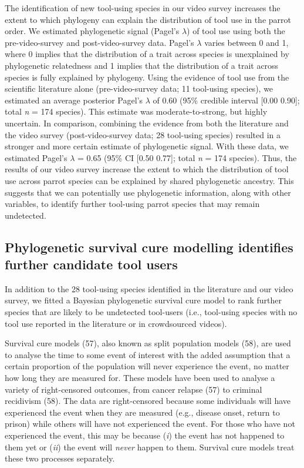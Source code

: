 \documentclass[
  man,floatsintext]{apa6}
\begin{document}
The identification of new tool-using species in our video survey increases the
extent to which phylogeny can explain the distribution of tool use in the parrot
order. We estimated phylogenetic signal (Pagel's \(\lambda\)) of tool use using
both the pre-video-survey and post-video-survey data. Pagel's \(\lambda\) varies
between 0 and 1, where 0 implies that the distribution of a trait across species
is unexplained by phylogenetic relatedness and 1 implies that the distribution
of a trait across species is fully explained by phylogeny. Using the evidence of
tool use from the scientific literature alone (pre-video-survey data; 11
tool-using species), we estimated an average posterior Pagel's \(\lambda\) of
0.60 (95\% credible interval {[}0.00
0.90{]}; total \emph{n} =
174 species). This estimate was moderate-to-strong, but highly
uncertain. In comparison, combining the evidence from both the literature and
the video survey (post-video-survey data; 28 tool-using species) resulted in a
stronger and more certain estimate of phylogenetic signal. With these data, we
estimated Pagel's \(\lambda\) = 0.65 (95\% CI
{[}0.50
0.77{]}; total \emph{n} =
174 species). Thus, the results of our video survey increase
the extent to which the distribution of tool use across parrot species can be
explained by shared phylogenetic ancestry. This suggests that we can potentially
use phylogenetic information, along with other variables, to identify further
tool-using parrot species that may remain undetected.

\hypertarget{phylogenetic-survival-cure-modelling-identifies-further-candidate-tool-users}{%
\subsection{Phylogenetic survival cure modelling identifies further candidate tool users}\label{phylogenetic-survival-cure-modelling-identifies-further-candidate-tool-users}}

In addition to the 28 tool-using species identified in the literature and our
video survey, we fitted a Bayesian phylogenetic survival cure model to rank
further species that are likely to be undetected tool-users (i.e., tool-using
species with no tool use reported in the literature or in crowdsourced videos).

Survival cure models (57), also known as split population
models (58), are used to analyse the time to some event of interest
with the added assumption that a certain proportion of the population will never
experience the event, no matter how long they are measured for. These models
have been used to analyse a variety of right-censored outcomes, from cancer
relapse (57) to criminal recidivism (58). The data are
right-censored because some individuals will have experienced the event when
they are measured (e.g., disease onset, return to prison) while others will have
not experienced the event. For those who have not experienced the event, this
may be because (\emph{i}) the event has not happened to them yet or (\emph{ii}) the event
will \emph{never} happen to them. Survival cure models treat these two processes
separately.
\end{document}

